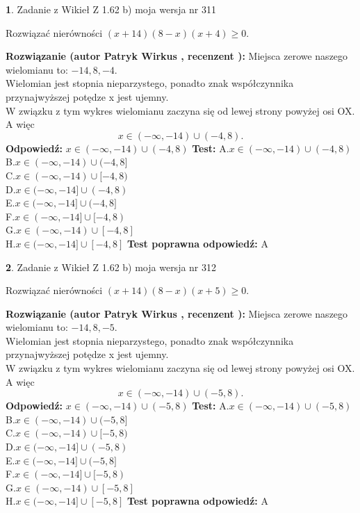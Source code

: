 \documentclass[12pt, a4paper]{article}
\theoremstyle{definition} %
\newtheorem{zad}{}
\newcommand{\zadStart}[1]{\begin{zad}#1\newline}
\newcommand{\zadStop}{\end{zad}}
\newcommand{\rozwStart}[2]{\noindent \textbf{Rozwiązanie (autor #1 , recenzent #2): }\newline}
\newcommand{\rozwStop}{\newline}
\newcommand{\odpStart}{\noindent \textbf{Odpowiedź:}\newline}
\newcommand{\odpStop}{\newline}
\newcommand{\testStart}{\noindent \textbf{Test:}\newline}
\newcommand{\testStop}{\newline}
\newcommand{\kluczStart}{\noindent \textbf{Test poprawna odpowiedź:}\newline}
\newcommand{\kluczStop}{\newline}
\begin{document}
\zadStart{Zadanie z Wikieł Z 1.62 b) moja wersja nr 311}

Rozwiązać nierówności $(x+14)(8-x)(x+4)\ge0$.
\zadStop
\rozwStart{Patryk Wirkus}{}
Miejsca zerowe naszego wielomianu to: $-14, 8, -4$.\\
Wielomian jest stopnia nieparzystego, ponadto znak współczynnika przy\linebreak najwyższej potędze x jest ujemny.\\ W związku z tym wykres wielomianu zaczyna się od lewej strony powyżej osi OX. A więc $$x \in (-\infty,-14) \cup (-4,8).$$
\rozwStop
\odpStart
$x \in (-\infty,-14) \cup (-4,8)$
\odpStop
\testStart
A.$x \in (-\infty,-14) \cup (-4,8)$\\
B.$x \in (-\infty,-14) \cup (-4,8]$\\
C.$x \in (-\infty,-14) \cup [-4,8)$\\
D.$x \in (-\infty,-14] \cup (-4,8)$\\
E.$x \in (-\infty,-14] \cup (-4,8]$\\
F.$x \in (-\infty,-14] \cup [-4,8)$\\
G.$x \in (-\infty,-14) \cup [-4,8]$\\
H.$x \in (-\infty,-14] \cup [-4,8]$
\testStop
\kluczStart
A
\kluczStop



\zadStart{Zadanie z Wikieł Z 1.62 b) moja wersja nr 312}

Rozwiązać nierówności $(x+14)(8-x)(x+5)\ge0$.
\zadStop
\rozwStart{Patryk Wirkus}{}
Miejsca zerowe naszego wielomianu to: $-14, 8, -5$.\\
Wielomian jest stopnia nieparzystego, ponadto znak współczynnika przy\linebreak najwyższej potędze x jest ujemny.\\ W związku z tym wykres wielomianu zaczyna się od lewej strony powyżej osi OX. A więc $$x \in (-\infty,-14) \cup (-5,8).$$
\rozwStop
\odpStart
$x \in (-\infty,-14) \cup (-5,8)$
\odpStop
\testStart
A.$x \in (-\infty,-14) \cup (-5,8)$\\
B.$x \in (-\infty,-14) \cup (-5,8]$\\
C.$x \in (-\infty,-14) \cup [-5,8)$\\
D.$x \in (-\infty,-14] \cup (-5,8)$\\
E.$x \in (-\infty,-14] \cup (-5,8]$\\
F.$x \in (-\infty,-14] \cup [-5,8)$\\
G.$x \in (-\infty,-14) \cup [-5,8]$\\
H.$x \in (-\infty,-14] \cup [-5,8]$
\testStop
\kluczStart
A
\kluczStop
\end{document}
